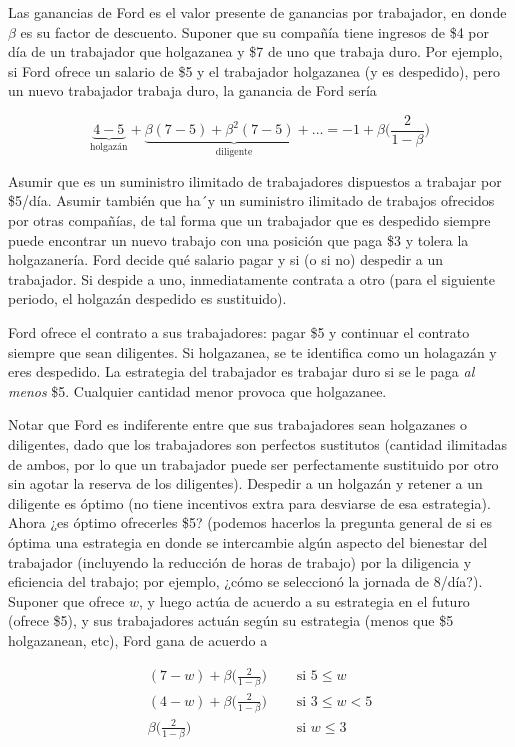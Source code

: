 \documentclass[12pt]{scrartcl}
\begin{document}
Las ganancias de Ford es el valor presente de ganancias por trabajador, en donde $\beta$ es su factor de descuento. Suponer que su compañía tiene ingresos de \$4 por día de un trabajador que holgazanea y \$7 de uno que trabaja duro. Por ejemplo, si Ford ofrece un salario de \$5 y el trabajador holgazanea (y es despedido), pero un nuevo trabajador trabaja duro, la ganancia de Ford sería

\[ 
	\underbrace{4-5}_{\text{holgazán}}+\underbrace{\beta(7-5)+\beta^2(7-5)+\dots}_{\text{diligente}}=-1 + \beta\Bigg (\frac{2}{1-\beta} \Bigg )
\]

Asumir que es un suministro ilimitado de trabajadores dispuestos a trabajar por \$5/día. Asumir también que ha´y un suministro ilimitado de trabajos ofrecidos por otras compañías, de tal forma que un trabajador que es despedido siempre puede encontrar un nuevo trabajo con una posición que paga \$3 y tolera la holgazanería. Ford decide qué salario pagar y si (o si no) despedir a un trabajador. Si despide a uno, inmediatamente contrata a otro (para el siguiente periodo, el holgazán despedido es sustituido). 

Ford ofrece el contrato a sus trabajadores: pagar \$5 y continuar el contrato siempre que sean diligentes. Si holgazanea, se te identifica como un holagazán y eres despedido. La estrategia del trabajador es trabajar duro si se le paga \textit{al menos} \$5. Cualquier cantidad menor provoca que holgazanee.

Notar que Ford es indiferente entre que sus trabajadores sean holgazanes o diligentes, dado que los trabajadores son perfectos sustitutos (cantidad ilimitadas de ambos, por lo que un trabajador puede ser perfectamente sustituido por otro sin agotar la reserva de los diligentes). Despedir a un holgazán y retener a un diligente es óptimo (no tiene incentivos extra para desviarse de esa estrategia). Ahora ¿es óptimo ofrecerles \$5? (podemos hacerlos la pregunta general de si es óptima una estrategia en donde se intercambie algún aspecto del bienestar del trabajador (incluyendo la reducción de horas de trabajo) por la diligencia y eficiencia del trabajo; por ejemplo, ¿cómo se seleccionó la jornada de 8/día?). Suponer que ofrece $w$, y luego actúa de acuerdo a su estrategia en el futuro (ofrece \$5), y sus trabajadores actuán según su estrategia (menos que \$5 holgazanean, etc), Ford gana de acuerdo a

\begin{align*}
	(7-w) + \beta\Bigg (\frac{2}{1-\beta} \Bigg )\quad & \text{ si } 5 \leq w     \\
	(4-w)+\beta\Bigg (\frac{2}{1-\beta} \Bigg )\quad   & \text{ si } 3 \leq w < 5 \\
	\beta\Bigg (\frac{2}{1-\beta} \Bigg )\quad         & \text{ si } w \leq 3     
\end{align*}
\end{document}
